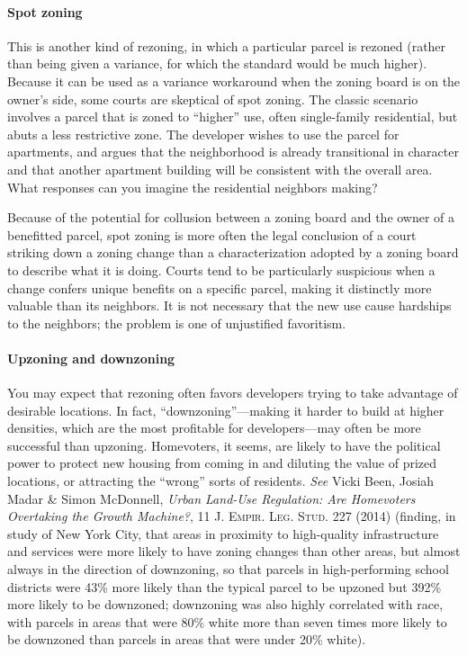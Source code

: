 \paragraph{Spot zoning} This is another kind of rezoning, in which a particular
parcel is rezoned (rather than being given a variance, for which the standard
would be much higher). Because it can be used as a variance workaround when the
zoning board is on the owner's side, some courts are skeptical of spot zoning.
The classic scenario involves a parcel that is zoned to ``higher'' use, often
single-family residential, but abuts a less restrictive zone. The developer
wishes to use the parcel for apartments, and argues that the neighborhood is
already transitional in character and that another apartment building will be
consistent with the overall area. What responses can you imagine the residential
neighbors making? 

Because of the potential for collusion between a zoning board and the owner of a
benefitted parcel, spot zoning is more often the legal conclusion of a court
striking down a zoning change than a characterization adopted by a zoning board
to describe what it is doing. Courts tend to be particularly suspicious when a
change confers unique benefits on a specific parcel, making it distinctly more
valuable than its neighbors. It is not necessary that the new use cause
hardships to the neighbors; the problem is one of unjustified favoritism.

\paragraph{Upzoning and downzoning} You may expect that rezoning often favors
developers trying to take advantage of desirable locations. In fact,
``downzoning''---making it harder to build at higher densities, which are the
most profitable for developers---may often be more successful than upzoning.
Homevoters, it seems, are likely to have the political power to protect new
housing from coming in and diluting the value of prized locations, or attracting
the ``wrong'' sorts of residents. \textit{See} Vicki Been, Josiah Madar \& Simon
McDonnell, \textit{Urban Land-Use Regulation: Are Homevoters Overtaking the
Growth Machine?}, 11 \textsc{J. Empir. Leg. Stud.} 227 (2014) (finding, in study
of New York City, that areas in proximity to high-quality infrastructure and
services were more likely to have zoning changes than other areas, but almost
always in the direction of downzoning, so that parcels in high-performing school
districts were 43\% more likely than the typical parcel to be upzoned but 392\%
more likely to be downzoned; downzoning was also highly correlated with race,
with parcels in areas that were 80\% white more than seven times more likely to
be downzoned than parcels in areas that were under 20\% white).


